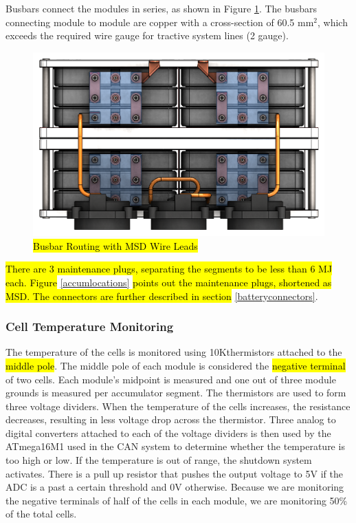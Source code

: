 \documentclass{article}
\DeclareRobustCommand{\hlr}[1]{{\sethlcolor{red}\hl{#1}}}
\begin{document}
            Busbars connect the modules in series, as shown in Figure \ref{busbar}. The busbars connecting module to module are copper with a cross-section of 60.5 mm$^2$, which exceeds the required wire gauge for tractive system lines (2 gauge).

            \begin{figure}[H]
                \centering
                \includegraphics[width = 0.6 \textwidth]{busbar_routing}
                \caption{\hlr{Busbar Routing with MSD Wire Leads}}
                \label{busbar}
            \end{figure}

            \hlr{There are 3 maintenance plugs, separating the segments to be less than 6 MJ each. Figure }\ref{accumlocations} \hlr{ points out the maintenance plugs, shortened as MSD. The connectors are further described in section} \ref{batteryconnectors}.

        \subsubsection{Cell Temperature Monitoring} %


            The temperature of the cells is monitored using 10K\ohm thermistors attached to the \hlr{middle pole}. The middle pole of each module is considered the \hlr{negative terminal} of two cells. Each module’s midpoint is measured and one out of three module grounds is measured per accumulator segment. The thermistors are used to form three voltage dividers. When the temperature of the cells increases, the resistance decreases, resulting in less voltage drop across the thermistor. Three analog to digital converters attached to each of the voltage dividers is then used by the ATmega16M1 used in the CAN system to determine whether the temperature is too high or low. If the temperature is out of range, the shutdown system activates. There is a pull up resistor that pushes the output voltage to 5V if the ADC is a past a certain threshold and 0V otherwise. Because we are monitoring the negative terminals of half of the cells in each module, we are monitoring 50\% of the total cells.
\end{document}
